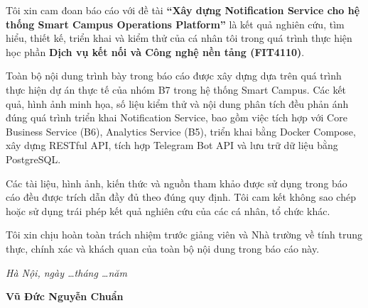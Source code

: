 
Tôi xin cam đoan báo cáo với đề tài \textbf{``Xây dựng Notification Service cho hệ thống Smart Campus Operations Platform''} là kết quả nghiên cứu, tìm hiểu, thiết kế, triển khai và kiểm thử của cá nhân tôi trong quá trình thực hiện học phần \textbf{Dịch vụ kết nối và Công nghệ nền tảng (FIT4110)}.

Toàn bộ nội dung trình bày trong báo cáo được xây dựng dựa trên quá trình thực hiện dự án thực tế của nhóm B7 trong hệ thống Smart Campus. Các kết quả, hình ảnh minh họa, số liệu kiểm thử và nội dung phân tích đều phản ánh đúng quá trình triển khai Notification Service, bao gồm việc tích hợp với Core Business Service (B6), Analytics Service (B5), triển khai bằng Docker Compose, xây dựng RESTful API, tích hợp Telegram Bot API và lưu trữ dữ liệu bằng PostgreSQL.

Các tài liệu, hình ảnh, kiến thức và nguồn tham khảo được sử dụng trong báo cáo đều được trích dẫn đầy đủ theo đúng quy định. Tôi cam kết không sao chép hoặc sử dụng trái phép kết quả nghiên cứu của các cá nhân, tổ chức khác.

Tôi xin chịu hoàn toàn trách nhiệm trước giảng viên và Nhà trường về tính trung thực, chính xác và khách quan của toàn bộ nội dung trong báo cáo này.

\vspace{1cm}

\begin{flushright}
\begin{minipage}{8cm}
\centering
\textit{Hà Nội, ngày \ldots tháng \ldots năm \Nam}

\vspace{0.5cm}

\textbf{Vũ Đức Nguyễn Chuẩn}

\vspace{2cm}

\textbf{\TenSinhVien}
\end{minipage}
\end{flushright}

